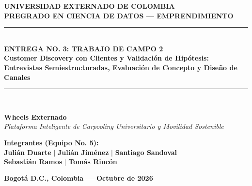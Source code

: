 \documentclass[11pt,a4paper]{article}
\begin{document}
\begin{titlepage}
    \centering
    \vspace*{0.5cm}
    {\Huge \textbf{\color{primary} UNIVERSIDAD EXTERNADO DE COLOMBIA}}\\[0.3cm]
    {\Large \textbf{\color{secondary} PREGRADO EN CIENCIA DE DATOS --- EMPRENDIMIENTO}}\\[1.5cm]
    
    \rule{\linewidth}{0.8mm}\\[0.4cm]
    {\Huge \textbf{ENTREGA NO. 3: TRABAJO DE CAMPO 2}}\\[0.3cm]
    {\Large \textbf{Customer Discovery con Clientes y Validaci\'on de Hip\'otesis:\\Entrevistas Semiestructuradas, Evaluaci\'on de Concepto y Dise\~no de Canales}}\\[0.4cm]
    \rule{\linewidth}{0.8mm}\\[1.2cm]
    
    \begin{tcolorbox}[colback=primary!5,colframe=primary,arc=4mm,boxrule=1.5pt]
        \centering \huge \color{primary}
        \textbf{Wheels Externado} \\[0.2cm]
        \large \color{darkgray}
        \textit{Plataforma Inteligente de Carpooling Universitario y Movilidad Sostenible}
    \end{tcolorbox}
    
    \vfill
    
    \begin{minipage}{0.85\textwidth}
        \centering
        \textbf{\large Integrantes (Equipo No. 5):}\\[0.35cm]
        \textbf{Juli\'an Duarte} \quad $\vert$ \quad \textbf{Juli\'an Jim\'enez} \quad $\vert$ \quad \textbf{Santiago Sandoval}\\[0.2cm]
        \textbf{Sebasti\'an Ramos} \quad $\vert$ \quad \textbf{Tom\'as Rinc\'on}
    \end{minipage}
    
    \vfill
    {\large \textbf{Bogot\'a D.C., Colombia --- Octubre de 2026}}
\end{titlepage}

\tableofcontents
\newpage

\end{document}
